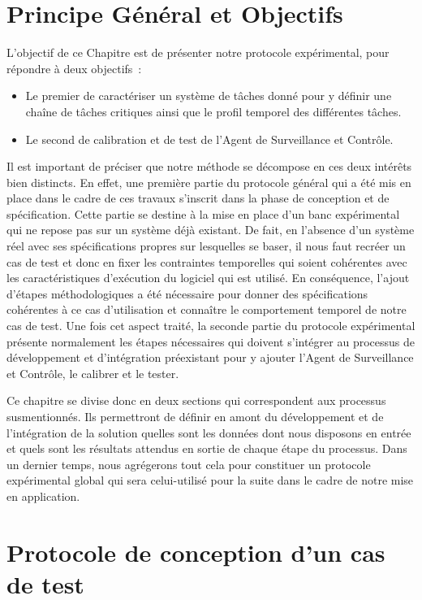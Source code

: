 \documentclass[french, a4paper, 11pt, twoside, pdftex]{StyleThese}
\begin{document}
\section{Principe Général et Objectifs}
        L'objectif de ce Chapitre est de présenter notre protocole expérimental, pour répondre à deux objectifs~: 
        \begin{itemize}
        	\item Le premier de caractériser un système de tâches donné pour y définir une chaîne de tâches critiques ainsi que le profil temporel des différentes tâches. 
        	\item         Le second de calibration et de test de l'Agent de Surveillance et Contrôle.
        \end{itemize}
        Il est important de préciser que notre méthode se décompose en ces deux intérêts bien distincts. En effet, une première partie du protocole général qui a été mis en place dans le cadre de ces travaux s'inscrit dans la phase de conception et de spécification. Cette partie se destine à la mise en place d'un banc expérimental qui ne repose pas sur un système déjà existant. De fait, en l'absence d'un système réel avec ses  spécifications propres sur lesquelles se baser, il nous faut recréer un cas de test et donc en fixer les contraintes temporelles qui soient cohérentes avec les caractéristiques d'exécution du logiciel qui est utilisé. En conséquence, l'ajout d'étapes méthodologiques a été nécessaire pour donner des spécifications cohérentes à ce cas d'utilisation et connaître le comportement temporel de notre cas de test. 
        Une fois cet aspect traité, la seconde partie du protocole expérimental présente normalement les étapes nécessaires qui doivent s'intégrer au processus de développement et d'intégration préexistant pour y ajouter l'Agent de Surveillance et Contrôle, le calibrer et le tester.
        
        Ce chapitre se divise donc en deux sections qui correspondent aux processus susmentionnés. Ils permettront de définir en amont du développement et de l'intégration de la solution quelles sont les données dont nous disposons en entrée et quels sont les résultats attendus en sortie de chaque étape du processus. Dans un dernier temps, nous agrégerons tout cela pour constituer un protocole expérimental global qui sera celui-utilisé pour la suite dans le cadre de notre mise en application.
        
        \section{Protocole de conception d'un cas de test}
        
\end{document}
